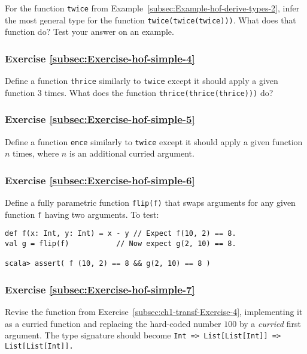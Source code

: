 For the function \lstinline!twice! from Example~\ref{subsec:Example-hof-derive-types-2},
infer the most general type for the function \lstinline!twice(twice(twice)))!.
What does that function do? Test your answer on an example.

\subsubsection{Exercise \label{subsec:Exercise-hof-simple-4}\ref{subsec:Exercise-hof-simple-4}}

Define a function \lstinline!thrice! similarly to \lstinline!twice!
except it should apply a given function $3$ times. What does the
function \lstinline!thrice(thrice(thrice)))! do?

\subsubsection{Exercise \label{subsec:Exercise-hof-simple-5}\ref{subsec:Exercise-hof-simple-5}}

Define a function \lstinline!ence! similarly to \lstinline!twice!
except it should apply a given function $n$ times, where $n$ is
an additional curried argument.

\subsubsection{Exercise \label{subsec:Exercise-hof-simple-6}\ref{subsec:Exercise-hof-simple-6}}

Define a fully parametric function \lstinline!flip(f)! that swaps
arguments for any given function \lstinline!f! having two arguments.
To test: 

\begin{lstlisting}
def f(x: Int, y: Int) = x - y // Expect f(10, 2) == 8.
val g = flip(f)           // Now expect g(2, 10) == 8.

scala> assert( f (10, 2) == 8 && g(2, 10) == 8 )
\end{lstlisting}


\subsubsection{Exercise \label{subsec:Exercise-hof-simple-7}\ref{subsec:Exercise-hof-simple-7}}

Revise the function from Exercise~\ref{subsec:ch1-transf-Exercise-4},
implementing it as a curried function and replacing the hard-coded
number $100$ by a \emph{curried} first argument. The type signature
should become \texttt{}\lstinline!Int => List[List[Int]] => List[List[Int]]!\texttt{.}

